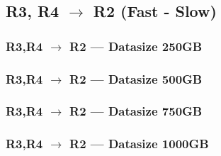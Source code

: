 \documentclass[a4paper,11pt]{article}
\begin{document}
\newpage


\subsection{R3, R4 $\rightarrow$ R2 (Fast - Slow)}
\subsubsection{R3,R4 $\rightarrow$ R2 --- Datasize 250GB}



\newpage
\subsubsection{R3,R4 $\rightarrow$ R2 --- Datasize 500GB}



\newpage
\subsubsection{R3,R4 $\rightarrow$ R2 --- Datasize 750GB}



\newpage
\subsubsection{R3,R4 $\rightarrow$ R2 --- Datasize 1000GB}



\newpage
\end{document}
